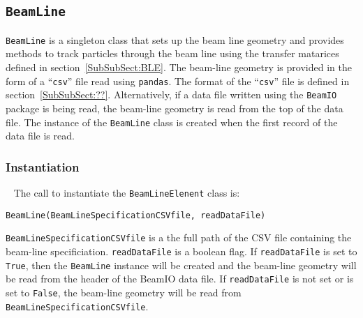 \pagebreak

\subsection{\texttt{BeamLine}}

\texttt{BeamLine} is a singleton class that sets up the beam line
geometry and provides methods to track particles through the beam line
using the transfer matarices defined in section~\ref{SubSubSect:BLE}.
The beam-line geometry is provided in the form of a ``\texttt{csv}''
file read using \texttt{pandas}.
The format of the ``\texttt{csv}'' file is defined in
section~\ref{SubSubSect:??}.
Alternatively, if a data file written using the \texttt{BeamIO}
package is being read, the beam-line geometry is read from the top of
the data file.
The instance of the \texttt{BeamLine} class is created when the first
record of the data file is read.

\subsubsection{Instantiation} ~\newline
\noindent
The call to instantiate the \texttt{BeamLineElenent} class is:
\begin{center}
  \texttt{BeamLine(BeamLineSpecificationCSVfile, readDataFile)}
\end{center}
\texttt{BeamLineSpecificationCSVfile} is a the full path of the CSV
file containing the beam-line specificiation.
\texttt{readDataFile} is a boolean flag.
If \texttt{readDataFile} is set to \texttt{True}, then the \texttt{BeamLine}
instance will be created and the beam-line geometry will be read from
the header of the BeamIO data file.
If \texttt{readDataFile} is not set or is set to \texttt{False}, the
beam-line geometry will be read from \\
\noindent \texttt{BeamLineSpecificationCSVfile}.

